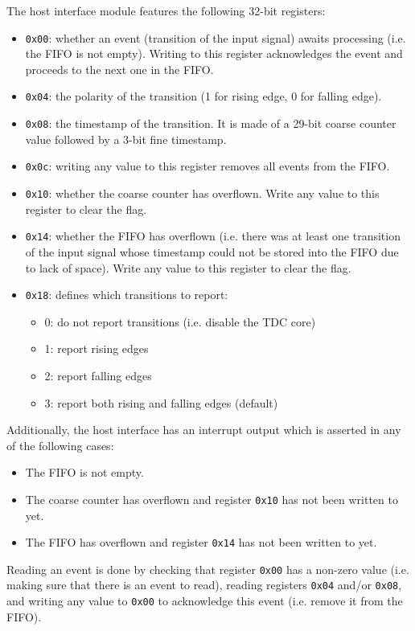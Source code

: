 \documentclass[a4paper,11pt]{article}
\begin{document}
The host interface module features the following 32-bit registers:
\begin{itemize}
\item \verb!0x00!: whether an event (transition of the input signal) awaits processing (i.e. the FIFO is not empty). Writing to this register acknowledges the event and proceeds to the next one in the FIFO.
\item \verb!0x04!: the polarity of the transition (1 for rising edge, 0 for falling edge).
\item \verb!0x08!: the timestamp of the transition. It is made of a 29-bit coarse counter value followed by a 3-bit fine timestamp.
\item \verb!0x0c!: writing any value to this register removes all events from the FIFO.
\item \verb!0x10!: whether the coarse counter has overflown. Write any value to this register to clear the flag.
\item \verb!0x14!: whether the FIFO has overflown (i.e. there was at least one transition of the input signal whose timestamp could not be stored into the FIFO due to lack of space). Write any value to this register to clear the flag.
\item \verb!0x18!: defines which transitions to report:
\begin{itemize}
\item 0: do not report transitions (i.e. disable the TDC core)
\item 1: report rising edges
\item 2: report falling edges
\item 3: report both rising and falling edges (default)
\end{itemize}
\end{itemize}

Additionally, the host interface has an interrupt output which is asserted in any of the following cases:
\begin{itemize}
\item The FIFO is not empty.
\item The coarse counter has overflown and register \verb!0x10! has not been written to yet.
\item The FIFO has overflown and register \verb!0x14! has not been written to yet.
\end{itemize}

Reading an event is done by checking that register \verb!0x00! has a non-zero value (i.e. making sure that there is an event to read), reading registers \verb!0x04! and/or \verb!0x08!, and writing any value to \verb!0x00! to acknowledge this event (i.e. remove it from the FIFO).
\end{document}

